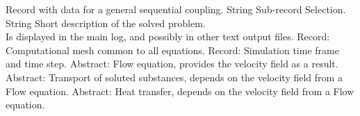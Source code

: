 \begin{RecordType}
	{}
	{} %
	{} %
	{} %
	{{{Record with data for a general sequential coupling.}}}
		\KeyItem
			{}
			{{String}}
			{\textrangle}
			{} %
			{{{Sub-record Selection.}}}
		\KeyItem
			{}
			{{String}}
			{\textrangle}
			{} %
			{{{Short description of the solved problem.}\\{
Is displayed in the main log, and possibly in other text output files.}}}
		\KeyItem
			{}
			{{Record}{: }}
			{\textrangle}
			{} %
			{{{Computational mesh common to all equations.}}}
		\KeyItem
			{}
			{{Record}{: }}
			{\textrangle}
			{} %
			{{{Simulation time frame and time step.}}}
		\KeyItem
			{}
			{{Abstract}{: }}
			{\textrangle}
			{} %
			{{{Flow equation, provides the velocity field as a result.}}}
		\KeyItem
			{}
			{{Abstract}{: }}
			{\textrangle}
			{} %
			{{{Transport of soluted substances, depends on the velocity field from a Flow equation.}}}
		\KeyItem
			{}
			{{Abstract}{: }}
			{\textrangle}
			{} %
			{{{Heat transfer, depends on the velocity field from a Flow equation.}}}
\end{RecordType}
